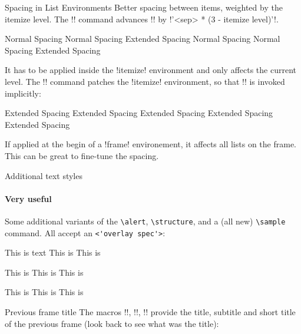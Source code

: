 \documentclass{beamer}
\begin{document}
\begin{frame}{Spacing in List Environments}
Better spacing between items, weighted by the itemize level.
\smallskip
\bi
  \ii The !\btAddExtraItemSep['<sep>=\smallskipamount']! command advances !\itemsep! by !'<sep> * (3 - itemize level)'!. 
\ei
\begin{LTXexample}[pos=r]
\bii
  \ii Normal Spacing
  \ii Normal Spacing
  \btAddExtraItemSep
  \ii Extended Spacing
    \bi
      \ii Normal Spacing
      \ii Normal Spacing
    \ei
  \ii Extended Spacing
\eii
\end{LTXexample}
\bi
  \ii It has to be applied inside the !itemize! environment and only affects the current level.
\ei
\framebreak
\bi
  \ii The !\btUseExtraItemSep['<sep>=\smallskipamount']! command patches the !itemize! environment, so that !\btAddExtraItemSep['<sep>']! is invoked implicitly: 
\ei
\begin{LTXexample}[pos=r]
\btUseExtraItemSep[1ex]
\bi
  \ii Extended Spacing
  \ii Extended Spacing
    \bi
      \ii Extended Spacing
      \ii Extended Spacing
    \ei
  \ii Extended Spacing
\ei
\end{LTXexample}
\bi
  \ii If applied at the begin of a !frame! environement, it affects all lists on the frame. 
  \ii This can be great to fine-tune the spacing.
\ei
\end{frame}

\begin{frame}[fragile]{Additional text styles}
  \framesubtitle{Very useful}
Some additional variants of the \lstinline{\alert}, \lstinline{\structure}, and a (all new) \lstinline{\sample} command. All accept an \lstinline{<'overlay spec'>}:
\begin{LTXexample}[pos=r]
  \bii
    \ii This is \alert{text}
    \ii This is 
    \ii This is 
  \eii
\end{LTXexample}
\begin{LTXexample}[pos=r]
  \bii
    \ii This is 
    \ii This is 
    \ii This is 
  \eii
\end{LTXexample}
\begin{LTXexample}[pos=r]
  \bii
    \ii This is 
    \ii This is 
    \ii This is 
  \eii
\end{LTXexample}
\end{frame}

\begin{frame}[fragile]{Previous frame title}
  The macros !\btPrevFrameTitle!, !\btPrevFrameSubtitle!, !\btPrevShortFrametitle! provide the title, subtitle and short title of the previous frame (look back to see what was the title):
\begin{LTXexample}[pos=r]
  \bii
    \ii \btPrevFrameTitle 
    \ii \btPrevFrameSubtitle
    \ii \btPrevShortFrameTitle
  \eii
\end{LTXexample}
\end{frame}
\end{document}
